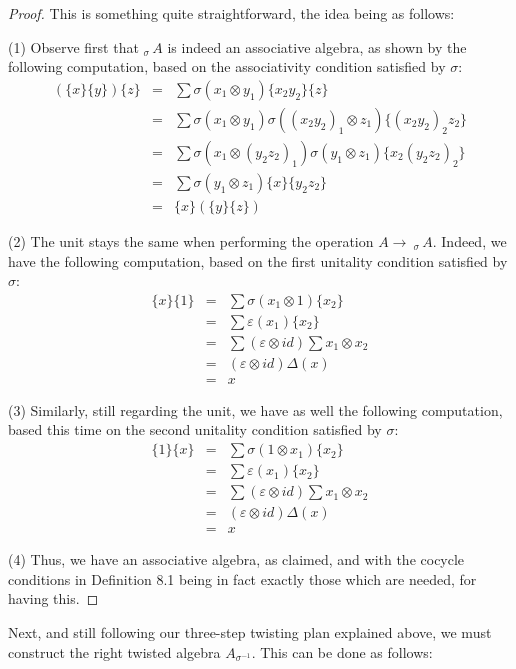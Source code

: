 \documentclass[12pt]{amsbook}
\begin{document}
\begin{proof}
This is something quite straightforward, the idea being as follows:

\medskip

(1) Observe first that $_{\sigma}\!\,A$ is indeed an associative algebra, as shown by the following computation, based on the associativity condition satisfied by $\sigma$:
\begin{eqnarray*}
(\{x\}\{y\})\{z\}
&=&\sum\sigma(x_1\otimes y_1)\{x_2y_2\}\{z\}\\
&=&\sum\sigma(x_1\otimes y_1)\sigma((x_2y_2)_1\otimes z_1)\{(x_2y_2)_2z_2\}\\
&=&\sum\sigma(x_1\otimes(y_2z_2)_1)\sigma(y_1\otimes z_1)\{x_2(y_2z_2)_2\}\\
&=&\sum\sigma(y_1\otimes z_1)\{x\}\{y_2z_2\}\\
&=&\{x\}(\{y\}\{z\})
\end{eqnarray*}

(2) The unit stays the same when performing the operation $A\to{\ }_{\sigma}\!\,A$. Indeed, we have the following computation, based on the first unitality condition satisfied by $\sigma$:
\begin{eqnarray*}
\{x\}\{1\}
&=&\sum\sigma(x_1\otimes 1)\{x_2\}\\
&=&\sum\varepsilon(x_1)\{x_2\}\\
&=&\sum(\varepsilon\otimes id)\sum x_1\otimes x_2\\
&=&(\varepsilon\otimes id)\Delta(x)\\
&=&x
\end{eqnarray*}

(3) Similarly, still regarding the unit, we have as well the following computation, based this time on the second unitality condition satisfied by $\sigma$:
\begin{eqnarray*}
\{1\}\{x\}
&=&\sum\sigma(1\otimes x_1)\{x_2\}\\
&=&\sum\varepsilon(x_1)\{x_2\}\\
&=&\sum(\varepsilon\otimes id)\sum x_1\otimes x_2\\
&=&(\varepsilon\otimes id)\Delta(x)\\
&=&x
\end{eqnarray*}

(4) Thus, we have an associative algebra, as claimed, and with the cocycle conditions in Definition 8.1 being in fact exactly those which are needed, for having this.
\end{proof}

Next, and still following our three-step twisting plan explained above, we must construct the right twisted algebra $A_{\sigma^{-1}}$. This can be done as follows:
\end{document}

